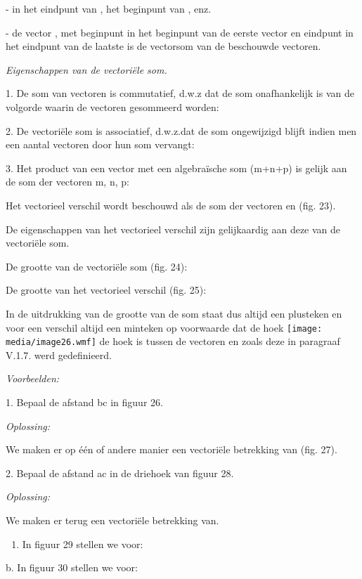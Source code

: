 \documentclass[]{article}
\begin{document}
- in het eindpunt van , het beginpunt van , enz.

- de vector , met beginpunt in het beginpunt van de eerste vector en
eindpunt in het eindpunt van de laatste is de vectorsom van de
beschouwde vectoren.

\emph{Eigenschappen van de vectoriële som.}

1. De som van vectoren is commutatief, d.w.z dat de som onafhankelijk is
van de volgorde waarin de vectoren gesommeerd worden:

2. De vectoriële som is associatief, d.w.z.dat de som ongewijzigd blijft
indien men een aantal vectoren door hun som vervangt:

3. Het product van een vector met een algebraïsche som (m+n+p) is gelijk
aan de som der vectoren m, n, p:

Het vectorieel verschil wordt beschouwd als de som der vectoren en (fig.
23).

De eigenschappen van het vectorieel verschil zijn gelijkaardig aan deze
van de vectoriële som.

De grootte van de vectoriële som (fig. 24):

De grootte van het vectorieel verschil (fig. 25):

In de uitdrukking van de grootte van de som staat dus altijd een
plusteken en voor een verschil altijd een minteken op voorwaarde dat de
hoek \texttt{[image: media/image26.wmf]} de hoek is tussen de vectoren
en zoals deze in paragraaf V.1.7. werd gedefinieerd.

\emph{Voorbeelden:}

1. Bepaal de afstand bc in figuur 26.

\emph{Oplossing:}

We maken er op één of andere manier een vectoriële betrekking van (fig.
27).

2. Bepaal de afstand ac in de driehoek van figuur 28.

\emph{Oplossing:}

We maken er terug een vectoriële betrekking van.

\begin{enumerate}
\def\labelenumi{\alph{enumi}.}
\item
  In figuur 29 stellen we voor:
\end{enumerate}

b. In figuur 30 stellen we voor:
\end{document}

